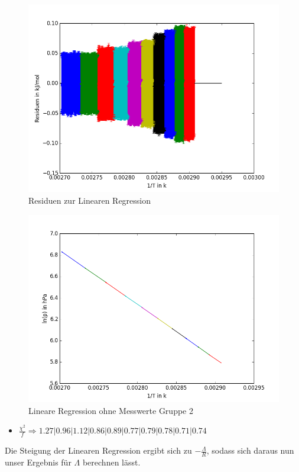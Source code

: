 \documentclass[12pt,a4paper]{article}
\begin{document}
\begin{figure}[H]
\centering
\includegraphics[scale=0.7]{Bilder/residuen_EL_neuerFehler.png}
\caption{Residuen zur Linearen Regression}
\end{figure}
\begin{figure}[H]
\centering
\includegraphics[scale=0.7]{Bilder/linreg_nurlinreg_EL.png}
\caption{Lineare Regression ohne Messwerte Gruppe 2}
\end{figure}
\begin{itemize}
\item $\frac{\chi^2}{f} \Rightarrow 1.27 | 0.96 | 1.12 | 0.86 | 0.89 | 0.77 | 0.79 | 0.78 | 0.71 | 0.74$
\end{itemize}
Die Steigung der Linearen Regression ergibt sich zu $-\frac{\Lambda}{R}$, sodass sich daraus nun unser Ergebnis für $\Lambda$ berechnen lässt.
\end{document}
